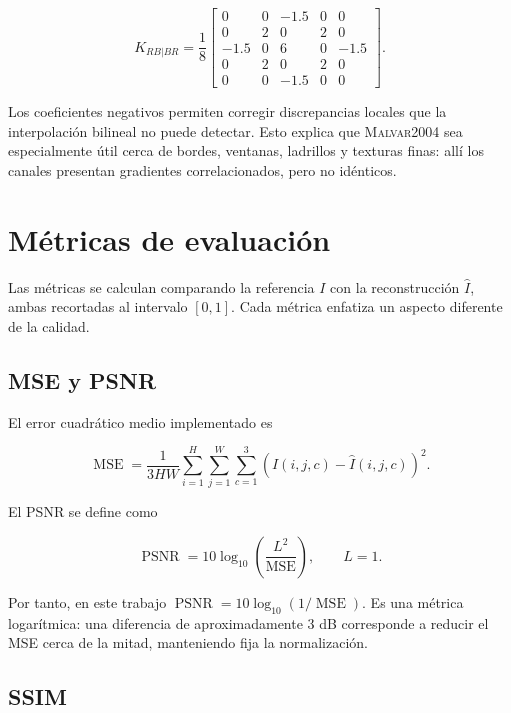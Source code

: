 \documentclass[11pt,a4paper]{article}
\newcommand{\malvar}{\textsc{Malvar2004}}
\begin{document}
\begin{equation}
 K_{RB|BR}=\frac{1}{8}
 \begin{bmatrix}
 0&0&-1.5&0&0\\
 0&2&0&2&0\\
 -1.5&0&6&0&-1.5\\
 0&2&0&2&0\\
 0&0&-1.5&0&0
 \end{bmatrix}.
 \label{eq:malvar-br}
\end{equation}

Los coeficientes negativos permiten corregir discrepancias locales que la interpolación bilineal no puede detectar. Esto explica que \malvar{} sea especialmente útil cerca de bordes, ventanas, ladrillos y texturas finas: allí los canales presentan gradientes correlacionados, pero no idénticos.

\section{Métricas de evaluación}

Las métricas se calculan comparando la referencia $I$ con la reconstrucción $\widehat I$, ambas recortadas al intervalo $[0,1]$. Cada métrica enfatiza un aspecto diferente de la calidad.

\subsection{MSE y PSNR}

El error cuadrático medio implementado es

\begin{equation}
 \operatorname{MSE}=\frac{1}{3HW}
 \sum_{i=1}^{H}\sum_{j=1}^{W}\sum_{c=1}^{3}
 \left(I(i,j,c)-\widehat I(i,j,c)\right)^2.
 \label{eq:mse}
\end{equation}

El PSNR se define como

\begin{equation}
 \operatorname{PSNR}=10\log_{10}\left(\frac{L^2}{\operatorname{MSE}}\right),
 \qquad L=1.
 \label{eq:psnr}
\end{equation}

Por tanto, en este trabajo $\operatorname{PSNR}=10\log_{10}(1/\operatorname{MSE})$. Es una métrica logarítmica: una diferencia de aproximadamente $3$ dB corresponde a reducir el MSE cerca de la mitad, manteniendo fija la normalización.

\subsection{SSIM}
\end{document}
